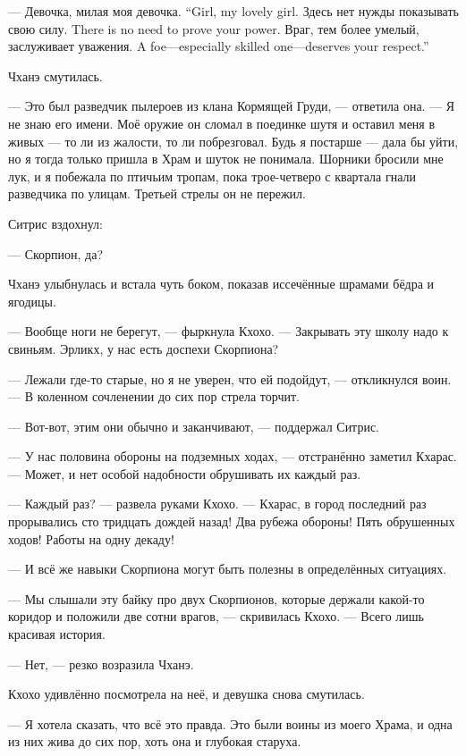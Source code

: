 {--- Девочка, милая моя девочка.}
{``Girl, my lovely girl.}
{Здесь нет нужды показывать свою силу.}
{There is no need to prove your power.}
{Враг, тем более умелый, заслуживает уважения.}
{A foe---especially skilled one---deserves your respect.''}

Чханэ смутилась.

--- Это был разведчик пылероев из клана Кормящей Груди, --- ответила она.
--- Я не знаю его имени.
Моё оружие он сломал в поединке шутя и оставил меня в живых --- то ли из жалости, то ли побрезговал.
Будь я постарше --- дала бы уйти, но я тогда только пришла в Храм и шуток не понимала.
Шорники бросили мне лук, и я побежала по птичьим тропам\FM, пока трое-четверо с квартала гнали разведчика по улицам.
Третьей стрелы он не пережил.

Ситрис вздохнул:

--- Скорпион, да?

Чханэ улыбнулась и встала чуть боком, показав иссечённые шрамами бёдра и ягодицы.

--- Вообще ноги не берегут, --- фыркнула Кхохо.
--- Закрывать эту школу надо к свиньям.
Эрликх, у нас есть доспехи Скорпиона?

--- Лежали где-то старые, но я не уверен, что ей подойдут, --- откликнулся воин.
--- В коленном сочленении до сих пор стрела торчит.

--- Вот-вот, этим они обычно и заканчивают, --- поддержал Ситрис.

--- У нас половина обороны на подземных ходах, --- отстранённо заметил Кхарас.
--- Может, и нет особой надобности обрушивать их каждый раз.

--- Каждый раз? --- развела руками Кхохо.
--- Кхарас, в город последний раз прорывались сто тридцать дождей назад!
Два рубежа обороны!
Пять обрушенных ходов!
Работы на одну декаду!

--- И всё же навыки Скорпиона могут быть полезны в определённых ситуациях.

--- Мы слышали эту байку про двух Скорпионов, которые держали какой-то коридор и положили две сотни врагов, --- скривилась Кхохо.
--- Всего лишь красивая история.

--- Нет, --- резко возразила Чханэ.

Кхохо удивлённо посмотрела на неё, и девушка снова смутилась.

--- Я хотела сказать, что всё это правда.
Это были воины из моего Храма, и одна из них жива до сих пор, хоть она и глубокая старуха.

